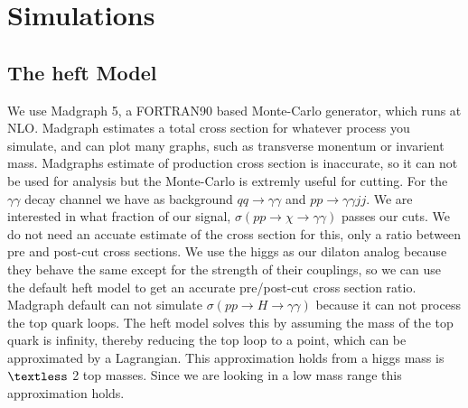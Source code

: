 \documentclass[twocolumn]{article}
\begin{document}
\section{Simulations}
\subsection{The heft Model}
We use Madgraph 5, a FORTRAN90 based Monte-Carlo generator, which runs at NLO. Madgraph estimates a total cross section for whatever process you simulate, and can plot many graphs, such as transverse monentum or invarient mass. Madgraphs estimate of production cross section is inaccurate, so it can not be used for analysis but the Monte-Carlo is extremly useful for cutting. For the \begin{math} \gamma \gamma \end{math} decay channel we have as background \begin{math} q q \rightarrow \gamma \gamma \end{math} and  \begin{math} p p  \rightarrow \gamma \gamma j j \end{math}. We are interested in what fraction of our signal, \begin{math} \sigma (p p \rightarrow \chi \rightarrow \gamma \gamma ) \end{math} passes our cuts. We do not need an accuate estimate of the cross section for this, only a ratio between pre and post-cut cross sections. We use the higgs as our dilaton analog because they behave the same except for the strength of their couplings, so we can use the default heft model to get an accurate pre/post-cut cross section ratio. Madgraph default can not simulate \begin{math} \sigma (p p \rightarrow H \rightarrow \gamma \gamma ) \end{math} because it can not process the top quark loops. The heft model solves this by assuming the mass of the top quark is infinity, thereby reducing the top loop to a point, which can be approximated by a Lagrangian. This approximation holds from a higgs mass is \begin{math} \textless \end{math} 2 top masses. Since we are looking in a low mass range this approximation holds.
\end{document}
